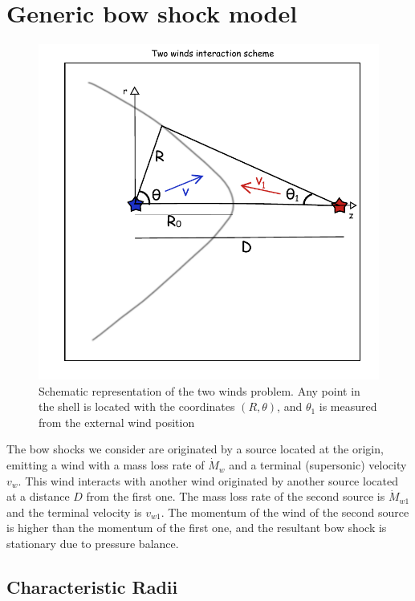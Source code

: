 \section{Generic bow shock model}
\label{sec:generic-model}

\begin{figure}
\includegraphics[width=\linewidth]{2winds-scheme}
\caption{Schematic representation of the two winds problem. Any point in the shell is located with the coordinates
$(R,\theta)$, and $\theta_1$ is measured from the external wind position}
\label{fig:2-winds}
\end{figure}

The bow shocks we consider are originated by a source located at the origin, emitting a wind with a mass loss rate of $\dot{M}_w$ and a terminal
(supersonic) velocity $v_w$. This wind interacts with another wind originated by another source located at a distance $D$ from the first one. 
The mass loss rate of the second source is $\dot{M}_{w1}$ and the terminal velocity is $v_{w1}$. The momentum of the wind of the second source is
higher than the momentum of the first one, and the resultant bow shock is stationary due to pressure balance. 

\subsection{Characteristic Radii}

